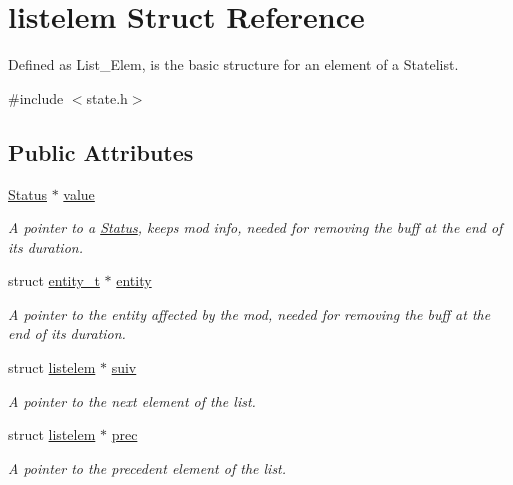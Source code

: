 \hypertarget{structlistelem}{}\section{listelem Struct Reference}
\label{structlistelem}


Defined as List\+\_\+\+Elem, is the basic structure for an element of a Statelist.  




{\ttfamily \#include $<$state.\+h$>$}

\subsection*{Public Attributes}
\begin{DoxyCompactItemize}
\item 
\mbox{\label{structlistelem_afe0b4c1f51cc97a734ba3bb38f5e21e5}} 
\hyperlink{struct_status}{Status} $\ast$ \hyperlink{structlistelem_afe0b4c1f51cc97a734ba3bb38f5e21e5}{value}
\begin{DoxyCompactList}\small\item\em A pointer to a \hyperlink{struct_status}{Status}, keeps mod info, needed for removing the buff at the end of it\textquotesingle{}s duration. \end{DoxyCompactList}\item 
\mbox{\label{structlistelem_a304447a8bcdd29930dbffc0da8453a24}} 
struct \hyperlink{structentity__t}{entity\+\_\+t} $\ast$ \hyperlink{structlistelem_a304447a8bcdd29930dbffc0da8453a24}{entity}
\begin{DoxyCompactList}\small\item\em A pointer to the entity affected by the mod, needed for removing the buff at the end of it\textquotesingle{}s duration. \end{DoxyCompactList}\item 
\mbox{\label{structlistelem_a71c6349a89e4afd6942fec76ea35c867}} 
struct \hyperlink{structlistelem}{listelem} $\ast$ \hyperlink{structlistelem_a71c6349a89e4afd6942fec76ea35c867}{suiv}
\begin{DoxyCompactList}\small\item\em A pointer to the next element of the list. \end{DoxyCompactList}\item 
\mbox{\label{structlistelem_ac301199bffea23040f494ec19cb9f7bd}} 
struct \hyperlink{structlistelem}{listelem} $\ast$ \hyperlink{structlistelem_ac301199bffea23040f494ec19cb9f7bd}{prec}
\begin{DoxyCompactList}\small\item\em A pointer to the precedent element of the list. \end{DoxyCompactList}\end{DoxyCompactItemize}


